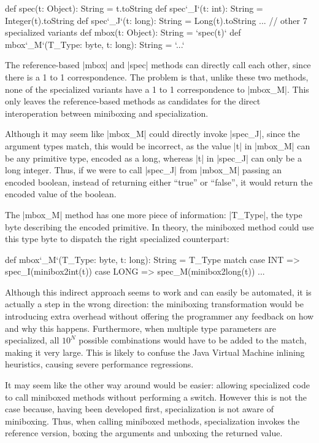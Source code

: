 \begin{lstlisting-nobreak}
 def spec(t: Object): String = t.toString
 def spec`_I`(t: int): String = Integer(t).toString
 def spec`_J`(t: long): String = Long(t).toString
 ... // other 7 specialized variants
 def mbox(t: Object): String = `spec(t)`
 def mbox`_M`(T_Type: byte, t: long): String = `...`
\end{lstlisting-nobreak}

The reference-based |mbox| and |spec| methods can directly call each other, since there is a 1 to 1 correspondence. The problem is that, unlike these two methods, none of the specialized variants have a 1 to 1 correspondence to |mbox_M|. This only leaves the reference-based methods as candidates for the direct interoperation between miniboxing and specialization.

Although it may seem like |mbox_M| could directly invoke |spec_J|, since the argument types match, this would be incorrect, as the value |t| in |mbox_M| can be any primitive type, encoded as a long, whereas |t| in |spec_J| can only be a long integer. Thus, if we were to call |spec_J| from |mbox_M| passing an encoded boolean, instead of returning either ``true'' or ``false'', it would return the encoded value of the boolean.

The |mbox_M| method has one more piece of information: |T_Type|, the type byte describing the encoded primitive. In theory, the miniboxed method could use this type byte to dispatch the right specialized counterpart:

\begin{lstlisting-nobreak}
 def mbox`_M`(T_Type: byte, t: long): String =
   T_Type match {
     case INT     => spec_I(minibox2int(t))
     case LONG => spec_M(minibox2long(t))
     ...
   }
\end{lstlisting-nobreak}

Although this indirect approach seems to work and can easily be automated, it is actually a  step in the wrong direction: the miniboxing transformation would be introducing extra overhead without offering the programmer any feedback on how and why this happens. Furthermore, when multiple type parameters are specialized, all $10^N$ possible combinations would have to be added to the match, making it very large. This is likely to confuse the Java Virtual Machine inlining heuristics, causing severe performance regressions.

It may seem like the other way around would be easier: allowing specialized code to call miniboxed methods without performing a switch. However this is not the case because, having been developed first, specialization is not aware of miniboxing. Thus, when calling miniboxed methods, specialization invokes the reference version, boxing the arguments and unboxing the returned value.

